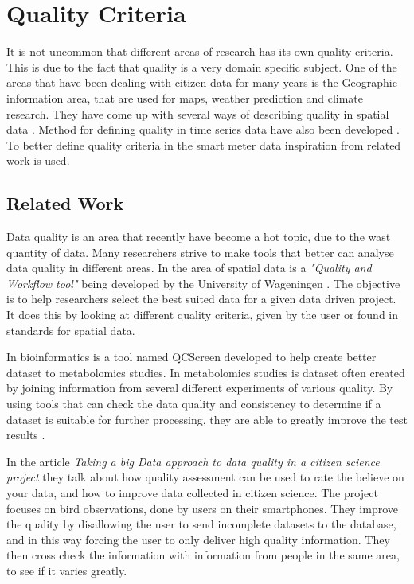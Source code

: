 \section{Quality Criteria}
It is not uncommon that different areas of research has its own quality criteria. This is due to the fact that quality is a very domain specific subject. One of the areas that have been dealing with citizen data for many years is the Geographic information area, that are used for maps, weather prediction and climate research. They have come up with several ways of describing quality in spatial data \cite{RefWorks:7}. Method for defining quality in time series data have also been developed  \cite{RefWorks:6}. To better define quality criteria in the smart meter data inspiration from related work is used.

\subsection{Related Work}
Data quality is an area that recently have become a hot topic, due to the wast quantity of data. Many researchers strive to make tools that better can analyse data quality in different areas. In the area of spatial data is a \emph{"Quality and Workflow tool"} being developed by the University of Wageningen \citep{RefWorks:8}. The objective is to help researchers select the best suited data for a given data driven project. It does this by looking at different quality criteria, given by the user or found in standards for spatial data. 

In bioinformatics is a tool named QCScreen developed to help create better dataset to metabolomics studies. In metabolomics studies is dataset often created by joining information from several different experiments of various quality. By using tools that can check the data quality and consistency to determine if a dataset is suitable for further processing, they are able to greatly improve the test results \citep{RefWorks:9}.
 
In the article \emph{Taking a big Data approach to data quality in a citizen science project}\citep{RefWorks:2} they talk about how quality assessment can be used to rate the 
believe on your data, and how to improve data collected in citizen science. The project focuses on bird observations, done by users on their smartphones. They improve the quality by disallowing the user to send incomplete datasets to the database, and in this way forcing the user to only deliver high quality information. They then cross check the information with information from people in the same area, to see if it varies greatly. 

